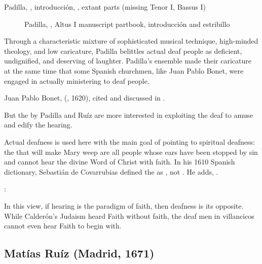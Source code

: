 \begin{exmusic}
\caption{Padilla, , introducción, , extant parts (missing Tenor I, Bassus I)}
\label{exmusic:Padilla-Sordo-intro}
\end{exmusic}
\begin{figure}
\caption{Padilla, , Altus I manuscript partbook, introducción and estribillo}
\label{figure:Padilla-Sordo-MS-estribillo}
\end{figure}

Through a characteristic mixture of sophisticated musical technique, high-minded theology, and low caricature, Padilla belittles actual deaf people as deficient, undignified, and deserving of laughter.
Padilla's ensemble made their caricature at the same time that some Spanish churchmen, like Juan Pablo Bonet, were engaged in actually ministering to deaf people.%
  \begin{Footnote}
  Juan Pablo Bonet,  (\XXX, 1620), cited and discussed in \autocite{Plann:DeafEducationSpain}.
  \end{Footnote}
But the  by Padilla and Ruíz are more interested in exploiting the deaf to amuse and edify the hearing.

Actual deafness is used here with the main goal of pointing to spiritual deafness: the  that will make Mary weep are all people whose ears have been stopped by sin and cannot hear the divine Word of Christ with faith.
In his 1610 Spanish dictionary, Sebastián de Covarrubias defined the  as , not .
He adds, .%
  \begin{Footnote}
  \autocite[]{Covarrubias:Tesoro}:
  \end{Footnote}
In this view, if hearing is the paradigm of faith, then deafness is its opposite.
While Calderón's Judaism heard Faith without faith, the deaf men in villancicos cannot even hear Faith to begin with.

\subsection{Matías Ruíz (Madrid, 1671)}


